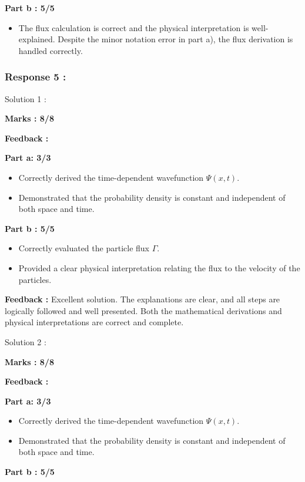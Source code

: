 \documentclass[a4paper,11pt]{article}
\begin{document}
\textbf{Part b : 5/5}

\begin{itemize}
    \item The flux calculation is correct and the physical interpretation is well-explained. Despite the minor notation error in part a), the flux derivation is handled correctly.
\end{itemize}


\subsubsection*{Response 5 :}

Solution 1 :

\textbf{Marks : 8/8}

\textbf{Feedback :}

\textbf{Part a: 3/3}
\begin{itemize}
    \item Correctly derived the time-dependent wavefunction $\Psi (x,t)$.
    \item Demonstrated that the probability density is constant and independent of both space and time.
\end{itemize}

\textbf{Part b : 5/5}

\begin{itemize}
    \item Correctly evaluated the particle flux $\Gamma$.
    \item Provided a clear physical interpretation relating the flux to the velocity of the particles.
\end{itemize}

\textbf{Feedback :}
Excellent solution. The explanations are clear, and all steps are logically followed and well presented. Both the mathematical derivations and physical interpretations are correct and complete.


Solution 2 :

\textbf{Marks : 8/8}

\textbf{Feedback :}

\textbf{Part a: 3/3}
\begin{itemize}
    \item Correctly derived the time-dependent wavefunction $\Psi (x,t)$.
    \item Demonstrated that the probability density is constant and independent of both space and time.
\end{itemize}

\textbf{Part b : 5/5}
\end{document}
